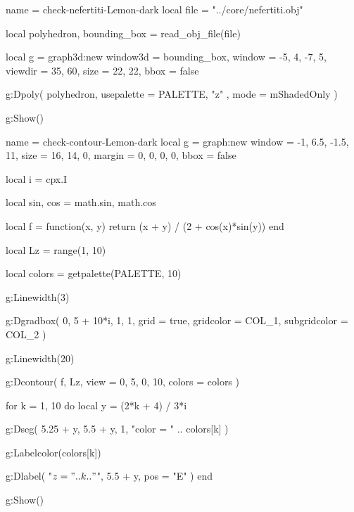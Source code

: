 \documentclass[theme = dark]{tutodoc}
\newcommand{\PALETTE}{Lemon}
\begin{document}

\vfill

\begin{luadraw}{name = check-nefertiti-\PALETTE-dark}
local file = "../core/nefertiti.obj"

local polyhedron, bounding_box = read_obj_file(file)

local g = graph3d:new{
  window3d = bounding_box,
  window   = {-5, 4, -7, 5},
  viewdir  = {35, 60},
  size     = {22, 22},
  bbox     = false
}

g:Dpoly(
  polyhedron,
  {
    usepalette = {PALETTE, "z" },
    mode       = mShadedOnly
  }
)

g:Show()
\end{luadraw}



\newpage

\begin{luadraw}{name = check-contour-\PALETTE-dark}
local g = graph:new{
  window = {-1, 6.5, -1.5, 11},
  size   = {16, 14, 0},
  margin = {0, 0, 0, 0},
  bbox   = false
}

local i = cpx.I

local sin, cos = math.sin, math.cos

local f = function(x, y)
  return (x + y) / (2 + cos(x)*sin(y))
end

local Lz = range(1, 10)

local colors = getpalette(PALETTE, 10)

g:Linewidth(3)

g:Dgradbox(
  {0, 5 + 10*i, 1, 1},
  {
    grid         = true,
    gridcolor    = COL_1,
    subgridcolor = COL_2
  }
)

g:Linewidth(20)

g:Dcontour(
  f,
  Lz,
  {
    view   = {0, 5, 0, 10},
    colors = colors
  }
)

for k = 1, 10 do
  local y = (2*k + 4) / 3*i

  g:Dseg(
    {5.25 + y, 5.5 + y},
    1,
    "color = " .. colors[k]
  )

  g:Labelcolor(colors[k])

  g:Dlabel(
    "$z = " .. k .. "$",
    5.5 + y,
    {pos = "E"}
  )
end

g:Show()
\end{luadraw}


\end{document}
